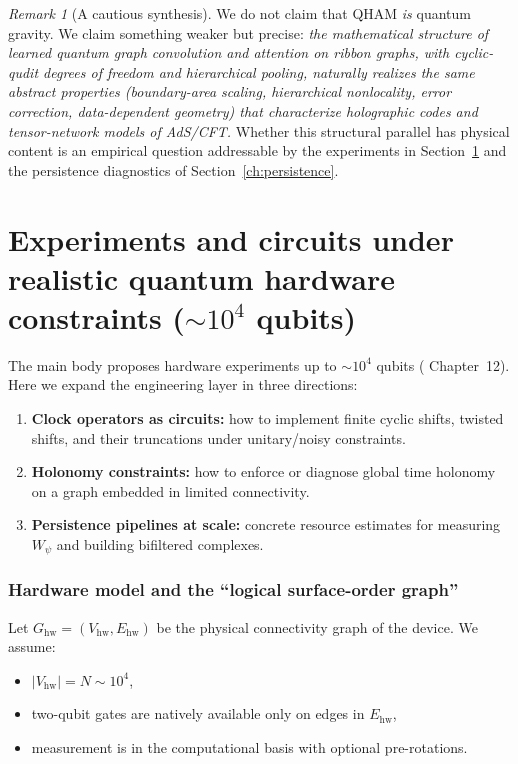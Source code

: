 \documentclass[11pt,oneside]{amsbook}
\numberwithin{equation}{section}
\theoremstyle{plain}
\theoremstyle{definition}
\theoremstyle{remark}
\newtheorem{remark}[theorem]{Remark}
\begin{document}
\begin{remark}[A cautious synthesis]
\label{rem:cautious_synthesis}
We do not claim that QHAM \emph{is} quantum gravity.
We claim something weaker but precise:
\emph{the mathematical structure of learned quantum graph convolution and attention on ribbon
graphs, with cyclic-qudit degrees of freedom and hierarchical pooling, naturally realizes the
same abstract properties (boundary-area scaling, hierarchical nonlocality, error correction,
data-dependent geometry) that characterize holographic codes and tensor-network models of AdS/CFT.}
Whether this structural parallel has physical content is an empirical question addressable by
the experiments in Section~\ref{ch:expts} and the persistence diagnostics of
Section~\ref{ch:persistence}.
\end{remark}



\chapter{Experiments and circuits under realistic quantum hardware constraints (\texorpdfstring{$\sim 10^4$}{~1e4} qubits)}

\label{ch:expts}


The  main body proposes hardware experiments up to $\sim 10^4$ qubits ( Chapter~12).
Here we expand the engineering layer in three directions:

\begin{enumerate}
\item \textbf{Clock operators as circuits:} how to implement finite cyclic shifts, twisted shifts, and their truncations under unitary/noisy constraints.
\item \textbf{Holonomy constraints:} how to enforce or diagnose global time holonomy on a graph embedded in limited connectivity.
\item \textbf{Persistence pipelines at scale:} concrete resource estimates for measuring $W_\psi$ and building bifiltered complexes.
\end{enumerate}

\subsection{Hardware model and the ``logical surface-order graph''}
\label{sec:hardware_model}

Let $G_{\mathrm{hw}}=(V_{\mathrm{hw}},E_{\mathrm{hw}})$ be the physical connectivity graph of the device.
We assume:
\begin{itemize}
\item $|V_{\mathrm{hw}}|=N\sim 10^4$,
\item two-qubit gates are natively available only on edges in $E_{\mathrm{hw}}$,
\item measurement is in the computational basis with optional pre-rotations.
\end{itemize}
\end{document}
